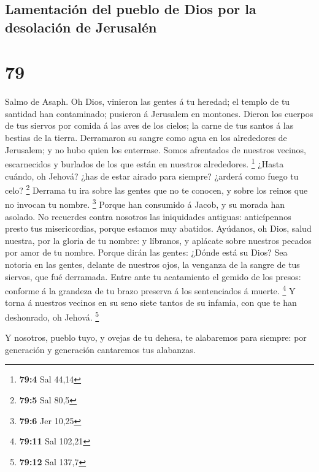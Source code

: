 \hypertarget{lamentaciuxf3n-del-pueblo-de-dios-por-la-desolaciuxf3n-de-jerusaluxe9n}{%
\subsection{Lamentación del pueblo de Dios por la desolación de
Jerusalén}\label{lamentaciuxf3n-del-pueblo-de-dios-por-la-desolaciuxf3n-de-jerusaluxe9n}}

\hypertarget{section-78}{%
\section{79}\label{section-78}}

 Salmo de Asaph. Oh Dios, vinieron las gentes á tu heredad;
el templo de tu santidad han contaminado; pusieron á Jerusalem en
montones.  Dieron los cuerpos de tus siervos por comida á
las aves de los cielos; la carne de tus santos á las bestias de la
tierra.  Derramaron su sangre como agua en los alrededores
de Jerusalem; y no hubo quien los enterrase.  Somos
afrentados de nuestros vecinos, escarnecidos y burlados de los que están
en nuestros alrededores. \footnote{\textbf{79:4} Sal 44,14} 
¿Hasta cuándo, oh Jehová? ¿has de estar airado para siempre? ¿arderá
como fuego tu celo? \footnote{\textbf{79:5} Sal 80,5} 
Derrama tu ira sobre las gentes que no te conocen, y sobre los reinos
que no invocan tu nombre. \footnote{\textbf{79:6} Jer 10,25}
 Porque han consumido á Jacob, y su morada han asolado.
 No recuerdes contra nosotros las iniquidades antiguas:
anticípennos presto tus misericordias, porque estamos muy abatidos.
 Ayúdanos, oh Dios, salud nuestra, por la gloria de tu
nombre: y líbranos, y aplácate sobre nuestros pecados por amor de tu
nombre.  Porque dirán las gentes: ¿Dónde está su Dios? Sea
notoria en las gentes, delante de nuestros ojos, la venganza de la
sangre de tus siervos, que fué derramada.  Entre ante tu
acatamiento el gemido de los presos: conforme á la grandeza de tu brazo
preserva á los sentenciados á muerte. \footnote{\textbf{79:11} Sal
  102,21}  Y torna á nuestros vecinos en su seno siete
tantos de su infamia, con que te han deshonrado, oh Jehová. \footnote{\textbf{79:12}
  Sal 137,7}

 Y nosotros, pueblo tuyo, y ovejas de tu dehesa, te
alabaremos para siempre: por generación y generación cantaremos tus
alabanzas.

